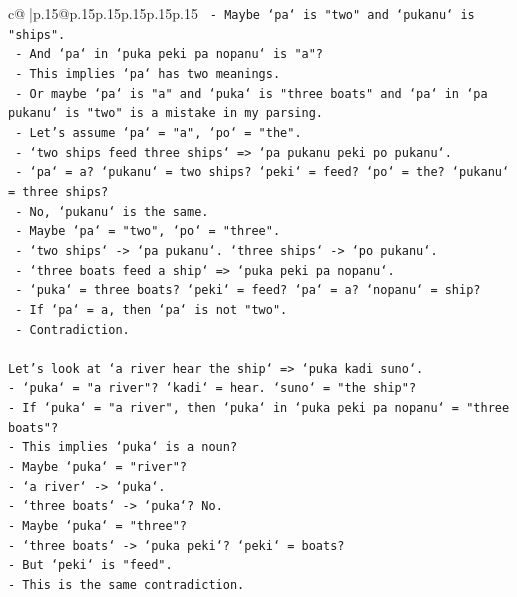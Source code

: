 \documentclass{article}
\begin{document}
{\begin{supertabular}{c@{$\;$}|p{.15\linewidth}@{}p{.15\linewidth}p{.15\linewidth}p{.15\linewidth}p{.15\linewidth}p{.15\linewidth}}
{{{\texttt{  {-} Maybe `pa` is "two" and `pukanu` is "ships".} \\
\texttt{  {-} And `pa` in `puka peki pa nopanu` is "a"?} \\
\texttt{  {-} This implies `pa` has two meanings.} \\
\texttt{  {-} Or maybe `pa` is "a" and `puka` is "three boats" and `pa` in `pa pukanu` is "two" is a mistake in my parsing.} \\
\texttt{  {-} Let's assume `pa` = "a", `po` = "the".} \\
\texttt{  {-} `two ships feed three ships` => `pa pukanu peki po pukanu`.} \\
\texttt{    {-} `pa` = a? `pukanu` = two ships? `peki` = feed? `po` = the? `pukanu` = three ships?} \\
\texttt{    {-} No, `pukanu` is the same.} \\
\texttt{  {-} Maybe `pa` = "two", `po` = "three".} \\
\texttt{  {-} `two ships` {-}> `pa pukanu`. `three ships` {-}> `po pukanu`.} \\
\texttt{  {-} `three boats feed a ship` => `puka peki pa nopanu`.} \\
\texttt{    {-} `puka` = three boats? `peki` = feed? `pa` = a? `nopanu` = ship?} \\
\texttt{    {-} If `pa` = a, then `pa` is not "two".} \\
\texttt{    {-} Contradiction.} \\
\\ 
\texttt{Let's look at `a river hear the ship` => `puka kadi suno`.} \\
\texttt{{-} `puka` = "a river"? `kadi` = hear. `suno` = "the ship"?} \\
\texttt{{-} If `puka` = "a river", then `puka` in `puka peki pa nopanu` = "three boats"?} \\
\texttt{{-} This implies `puka` is a noun?} \\
\texttt{{-} Maybe `puka` = "river"?} \\
\texttt{{-} `a river` {-}> `puka`.} \\
\texttt{{-} `three boats` {-}> `puka`? No.} \\
\texttt{{-} Maybe `puka` = "three"?} \\
\texttt{{-} `three boats` {-}> `puka peki`? `peki` = boats?} \\
\texttt{{-} But `peki` is "feed".} \\
\texttt{{-} This is the same contradiction.} \\
}}}
\end{supertabular}}
\end{document}
